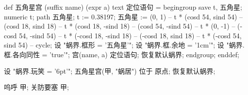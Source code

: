\usemodule[zhfonts]

def 五角星宫 (suffix name) (expr a) text 定位语句 =
  begingroup %
  save t, 五角星; numeric t; path 五角星;
  t := 0.38197;
  五角星 := (0, 1) -- t * (cosd 54, sind 54) -- (cosd 18, sind 18) 
    -- t * (cosd 18, -sind 18) -- (cosd 54, -sind 54) -- t * (0, -1)
    -- (-cosd 54, -sind 54) -- t * (-cosd 18, -sind 18) -- (-cosd 18, sind 18)
    -- t * (-cosd 54, sind 54) -- cycle;
  设 "蜗界.框形 = '五角星'";
  设 "蜗界.框.余地 = '1cm'";
  设 "蜗界.框.各向同性 = 'true'";
  宫(name, a) 定位语句;
  恢复默认蜗界;
  endgroup;
enddef;

设 "蜗界.玩笑 = '6pt'";
五角星宫(甲, "蜗居") 位于 原点;
恢复默认蜗界;

呜呼 甲;
关防要塞 甲;
\stopuseMPgraphic

\startTEXpage[offset=4pt]
\stopTEXpage
